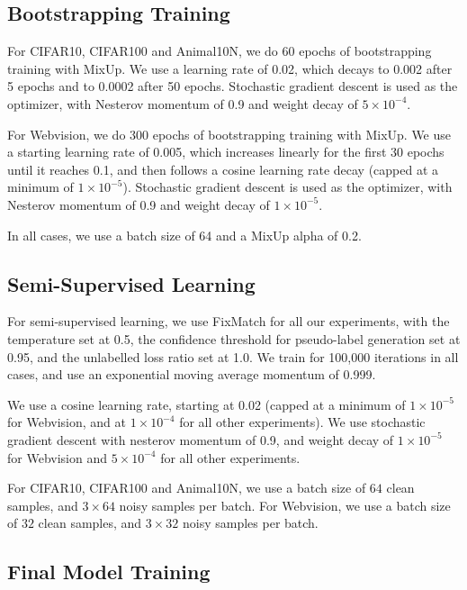 \documentclass[10pt,twocolumn,letterpaper]{article}
\begin{document}
\subsection{Bootstrapping Training}

For CIFAR10, CIFAR100 and Animal10N, we do 60 epochs of bootstrapping training with MixUp. We use a learning rate of 0.02, which decays to 0.002 after 5 epochs and to 0.0002 after 50 epochs. Stochastic gradient descent is used as the optimizer, with Nesterov momentum of 0.9 and weight decay of $5 \times 10^{-4}$.

For Webvision, we do 300 epochs of bootstrapping training with MixUp. We use a starting learning rate of 0.005, which increases linearly for the first 30 epochs until it reaches 0.1, and then follows a cosine learning rate decay (capped at a minimum of $1 \times 10^{-5}$). Stochastic gradient descent is used as the optimizer, with Nesterov momentum of 0.9 and weight decay of $1 \times 10^{-5}$.

In all cases, we use a batch size of 64 and a MixUp alpha of 0.2.

\subsection{Semi-Supervised Learning}

For semi-supervised learning, we use FixMatch for all our experiments, with the temperature set at 0.5, the confidence threshold for pseudo-label generation set at 0.95, and the unlabelled loss ratio set at 1.0. We train for 100,000 iterations in all cases, and use an exponential moving average momentum of 0.999.

We use a cosine learning rate, starting at 0.02 (capped at a minimum of $1 \times 10^{-5}$ for Webvision, and at $1 \times 10^{-4}$ for all other experiments). We use stochastic gradient descent with nesterov momentum of 0.9, and weight decay of $1 \times 10^{-5}$ for Webvision and $5 \times 10^{-4}$ for all other experiments.

For CIFAR10, CIFAR100 and Animal10N, we use a batch size of $64$ clean samples, and $3 \times 64$ noisy samples per batch. For Webvision, we use a batch size of $32$ clean samples, and $3 \times 32$ noisy samples per batch.

\subsection{Final Model Training}
\end{document}
